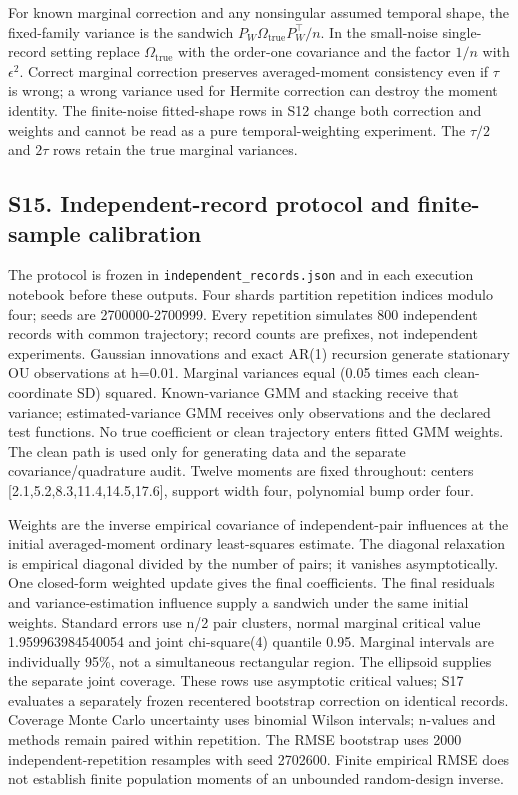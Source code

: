 \documentclass[
  american,
  11pt,
]{article}
\begin{document}
For known marginal correction and any nonsingular assumed temporal
shape, the fixed-family variance is the sandwich
\(P_W\Omega_{\mathrm{true}}P_W^\top/n\). In the small-noise
single-record setting replace \(\Omega_{\mathrm{true}}\) with the
order-one covariance and the factor \(1/n\) with \(\epsilon^2\). Correct
marginal correction preserves averaged-moment consistency even if
\(\tau\) is wrong; a wrong variance used for Hermite correction can
destroy the moment identity. The finite-noise fitted-shape rows in S12
change both correction and weights and cannot be read as a pure
temporal-weighting experiment. The \(\tau/2\) and \(2\tau\) rows retain
the true marginal variances.

\subsection{S15. Independent-record protocol and finite-sample
calibration}\label{s15.-independent-record-protocol-and-finite-sample-calibration}

The protocol is frozen in \texttt{independent\_records.json} and in each
execution notebook before these outputs. Four shards partition
repetition indices modulo four; seeds are 2700000-2700999. Every
repetition simulates 800 independent records with common trajectory;
record counts are prefixes, not independent experiments. Gaussian
innovations and exact AR(1) recursion generate stationary OU
observations at h=0.01. Marginal variances equal (0.05 times each
clean-coordinate SD) squared. Known-variance GMM and stacking receive
that variance; estimated-variance GMM receives only observations and the
declared test functions. No true coefficient or clean trajectory enters
fitted GMM weights. The clean path is used only for generating data and
the separate covariance/quadrature audit. Twelve moments are fixed
throughout: centers {[}2.1,5.2,8.3,11.4,14.5,17.6{]}, support width
four, polynomial bump order four.

Weights are the inverse empirical covariance of independent-pair
influences at the initial averaged-moment ordinary least-squares
estimate. The diagonal relaxation is empirical diagonal divided by the
number of pairs; it vanishes asymptotically. One closed-form weighted
update gives the final coefficients. The final residuals and
variance-estimation influence supply a sandwich under the same initial
weights. Standard errors use n/2 pair clusters, normal marginal critical
value 1.959963984540054 and joint chi-square(4) quantile 0.95. Marginal
intervals are individually 95\%, not a simultaneous rectangular region.
The ellipsoid supplies the separate joint coverage. These rows use
asymptotic critical values; S17 evaluates a separately frozen recentered
bootstrap correction on identical records. Coverage Monte Carlo
uncertainty uses binomial Wilson intervals; n-values and methods remain
paired within repetition. The RMSE bootstrap uses 2000
independent-repetition resamples with seed 2702600. Finite empirical
RMSE does not establish finite population moments of an unbounded
random-design inverse.
\end{document}
